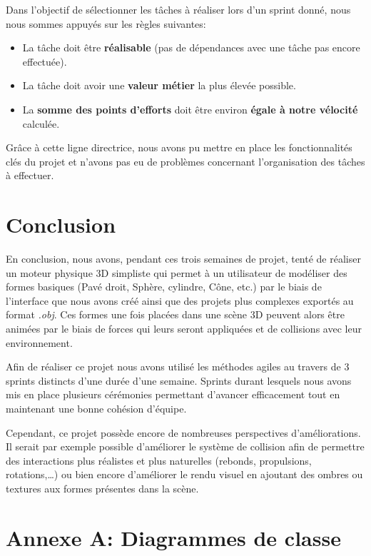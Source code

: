 \documentclass[11pt]{report}
\begin{document}
Dans l'objectif de sélectionner les tâches à réaliser lors d'un sprint donné, nous nous sommes appuyés sur les règles suivantes:
\begin{itemize}
  \item La tâche doit être \textbf{réalisable} (pas de dépendances avec une tâche pas encore effectuée).
  \item La tâche doit avoir une \textbf{valeur métier} la plus élevée possible.
  \item La \textbf{somme des points d'efforts} doit être environ \textbf{égale à notre vélocité} calculée.\newline
\end{itemize}

Grâce à cette ligne directrice, nous avons pu mettre en place les fonctionnalités clés du projet et n'avons pas eu de problèmes concernant l'organisation des tâches à effectuer.

\chapter{Conclusion}

En conclusion, nous avons, pendant ces trois semaines de projet, tenté de réaliser un moteur physique 3D simpliste qui permet à un utilisateur de modéliser des formes basiques (Pavé droit, Sphère, cylindre, Cône, etc.) par le biais de l'interface que nous avons créé ainsi que des projets plus complexes exportés au format \textit{.obj}. Ces formes une fois placées dans une scène 3D peuvent alors être animées par le biais de forces qui leurs seront appliquées et de collisions avec leur environnement.\newline

Afin de réaliser ce projet nous avons utilisé les méthodes agiles au travers de 3 sprints distincts d'une durée d'une semaine. Sprints durant lesquels nous avons mis en place plusieurs cérémonies permettant d'avancer efficacement tout en maintenant une bonne cohésion d'équipe.\newline

Cependant, ce projet possède encore de nombreuses perspectives d'améliorations. Il serait par exemple possible d'améliorer le système de collision afin de permettre des interactions plus réalistes et plus naturelles (rebonds, propulsions, rotations,\ldots) ou bien encore d'améliorer le rendu visuel en ajoutant des ombres ou textures aux formes présentes dans la scène.

\hypertarget{annexe}{\chapter{Annexe A: Diagrammes de classe}}
\end{document}
